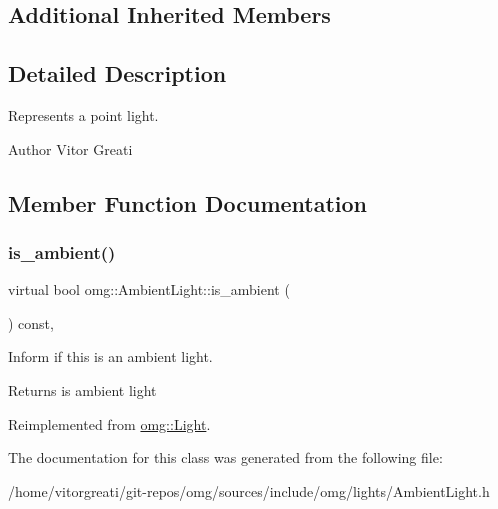 \subsection*{Additional Inherited Members}


\subsection{Detailed Description}
Represents a point light. 

\begin{DoxyAuthor}{Author}
Vitor Greati 
\end{DoxyAuthor}


\subsection{Member Function Documentation}
\mbox{\label{classomg_1_1_ambient_light_a97dcae69b5ef72ca8845e03a4c3185e4}} 
\subsubsection{\texorpdfstring{is\_ambient()}{is\_ambient()}}
{\footnotesize\ttfamily virtual bool omg\+::\+Ambient\+Light\+::is\+\_\+ambient (\begin{DoxyParamCaption}{ }\end{DoxyParamCaption}) const\hspace{0.3cm}{\ttfamily [inline]}, {\ttfamily [virtual]}}



Inform if this is an ambient light. 

\begin{DoxyReturn}{Returns}
is ambient light 
\end{DoxyReturn}


Reimplemented from \mbox{\hyperlink{classomg_1_1_light_a25277f4ac404857b8895e64f28c7cb13}{omg\+::\+Light}}.



The documentation for this class was generated from the following file\+:\begin{DoxyCompactItemize}
\item 
/home/vitorgreati/git-\/repos/omg/sources/include/omg/lights/Ambient\+Light.\+h\end{DoxyCompactItemize}
